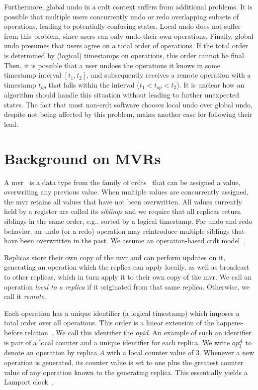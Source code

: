 \documentclass[sigplan]{acmart}
\newcommand{\op}[3][op]{$\mathit{#1}_{#2}^{#3}$} %
\begin{document}
Furthermore, global undo in a \gls{crdt} context suffers from additional problems.
It is possible that multiple users concurrently undo or redo overlapping subsets
of operations, leading to potentially confusing states.
Local undo does not suffer from this problem, since users can only undo 
their own operations.
Finally, global undo presumes that users agree on a total order of operations.
If the total order is determined by (logical) timestamps on operations,
this order cannot be final.
Then, it is possible that a user undoes the operations
it knows in some timestamp interval $[t_1, t_2]$, and subsequently receives
a remote operation with a timestamp $t_{op}$ that falls within the
interval ($t_1 < t_{op} < t_2$).
It is unclear how an algorithm should handle this situation without leading
to further unexpected states.
The fact that most non-\gls{crdt} software chooses local undo over global undo,
despite not being affected by this problem, makes another case for following their lead.

\section{Background on MVRs}\label{sec:background}

A \acrfull{mvr}~\cite{shapiro2011comprehensive} is a data type from the family
of \glspl*{crdt}~\cite{preguicca2018conflict} 
that can be assigned a value, overwriting any previous value.
When multiple values are concurrently assigned, the \gls*{mvr} retains all
values that have not been overwritten.
All values currently held by a register are called its \emph{siblings}
and we require that all replicas return siblings in the same order, e.g.,
sorted by a logical timestamp.
For undo and redo behavior, an undo (or a redo) operation
may reintroduce multiple siblings that have been overwritten in the past.
We assume an operation-based \gls*{crdt} model~\cite{baquero2017pure}.

Replicas store their own copy of the \gls{mvr} and can perform updates on it,
generating an operation which the replica can apply locally,
as well as broadcast to other replicas, which in turn apply it to their own
copy of the \gls{mvr}.
We call an operation \emph{local to a replica} if it originated from that
same replica.
Otherwise, we call it \emph{remote}.

Each operation has a unique identifier (a logical timestamp)
which imposes a total order over all operations.
This order is a linear extension of the happens-before relation~\cite{lamport1978time}.
We call this identifier the \emph{\gls*{opid}}.
An example of such an identifier is pair of a local counter and a unique identifier
for each replica.
We write \op{3}{A} to denote an operation by replica $A$
with a local counter value of $3$.
Whenever a new operation is generated, its counter value is set to one plus
the greatest counter value of any operation known to the generating replica.
This essentially yields a Lamport clock~\cite{lamport1978time}.
\end{document}
